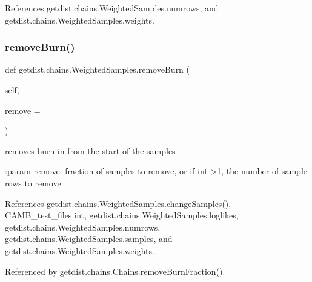 References getdist.\+chains.\+Weighted\+Samples.\+numrows, and getdist.\+chains.\+Weighted\+Samples.\+weights.

\mbox{\label{classgetdist_1_1chains_1_1WeightedSamples_abebbaf7a369f8cbe63df082ba39969bb}} 
\subsubsection{\texorpdfstring{remove\+Burn()}{removeBurn()}}
{\footnotesize\ttfamily def getdist.\+chains.\+Weighted\+Samples.\+remove\+Burn (\begin{DoxyParamCaption}\item[{}]{self,  }\item[{}]{remove = {} }\end{DoxyParamCaption})}

\begin{DoxyVerb}removes burn in from the start of the samples

:param remove: fraction of samples to remove, or if int >1, the number of sample rows to remove
\end{DoxyVerb}
 

References getdist.\+chains.\+Weighted\+Samples.\+change\+Samples(), C\+A\+M\+B\+\_\+test\+\_\+files.\+int, getdist.\+chains.\+Weighted\+Samples.\+loglikes, getdist.\+chains.\+Weighted\+Samples.\+numrows, getdist.\+chains.\+Weighted\+Samples.\+samples, and getdist.\+chains.\+Weighted\+Samples.\+weights.



Referenced by getdist.\+chains.\+Chains.\+remove\+Burn\+Fraction().

